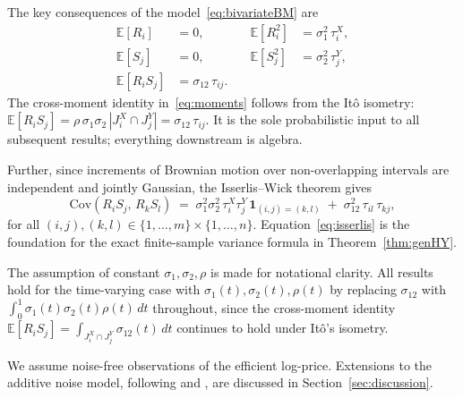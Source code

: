 The key consequences of the model~\eqref{eq:bivariateBM} are
\begin{align}\label{eq:moments}
  \mathbb{E}[R_i]     &= 0, &\quad \mathbb{E}[R_i^2] &= \sigma_1^2\,\tau_i^X, \nonumber \\
  \mathbb{E}[S_j]     &= 0, &\quad \mathbb{E}[S_j^2] &= \sigma_2^2\,\tau_j^Y, \\
  \mathbb{E}[R_i S_j] &= \sigma_{12}\,\tau_{ij}. & & \nonumber
\end{align}
The cross-moment identity in~\eqref{eq:moments} follows from the It\^{o}
isometry: $\mathbb{E}[R_i S_j] = \rho\,\sigma_1\sigma_2\,|J_i^X \cap J_j^Y|
= \sigma_{12}\,\tau_{ij}$.  It is the sole probabilistic input to all
subsequent results; everything downstream is algebra.

Further, since increments of Brownian motion over non-overlapping intervals
are independent and jointly Gaussian, the Isserlis--Wick theorem gives
\begin{equation}\label{eq:isserlis}
  \mathrm{Cov}(R_i S_j,\, R_k S_l)
  \;=\;
  \sigma_1^2\sigma_2^2\,\tau_i^X\tau_j^Y\,\mathbf{1}_{(i,j)=(k,l)}
  \;+\;
  \sigma_{12}^2\,\tau_{il}\,\tau_{kj},
\end{equation}
for all $(i,j),(k,l) \in \{1,\ldots,m\}\times\{1,\ldots,n\}$.
Equation~\eqref{eq:isserlis} is the foundation for the exact
finite-sample variance formula in Theorem~\ref{thm:genHY}.

\begin{remark}
The assumption of constant $\sigma_1,\sigma_2,\rho$ is made for notational
clarity.  All results hold for the time-varying case with
$\sigma_1(t),\sigma_2(t),\rho(t)$ by replacing $\sigma_{12}$ with
$\int_0^1 \sigma_1(t)\sigma_2(t)\rho(t)\,dt$ throughout, since the
cross-moment identity $\mathbb{E}[R_i S_j] = \int_{J_i^X \cap J_j^Y}
\sigma_{12}(t)\,dt$ continues to hold under It\^{o}'s isometry.
\end{remark}

\begin{remark}
We assume noise-free observations of the efficient log-price.  Extensions
to the additive noise model, following \citet{zhang2011estimating} and
\citet{bibinger2014estimating}, are discussed in
Section~\ref{sec:discussion}.
\end{remark}